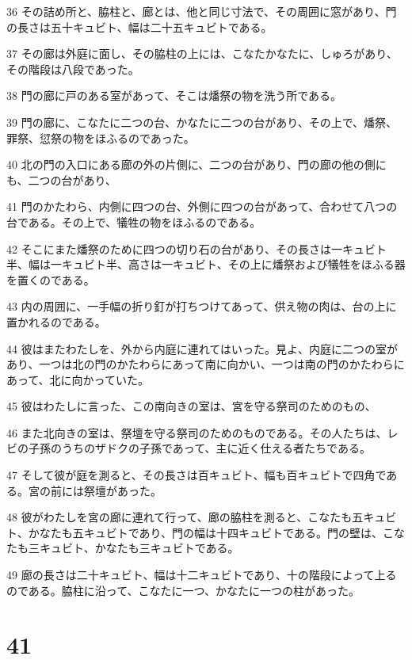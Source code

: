 \par 36 その詰め所と、脇柱と、廊とは、他と同じ寸法で、その周囲に窓があり、門の長さは五十キュビト、幅は二十五キュビトである。
\par 37 その廊は外庭に面し、その脇柱の上には、こなたかなたに、しゅろがあり、その階段は八段であった。
\par 38 門の廊に戸のある室があって、そこは燔祭の物を洗う所である。
\par 39 門の廊に、こなたに二つの台、かなたに二つの台があり、その上で、燔祭、罪祭、愆祭の物をほふるのであった。
\par 40 北の門の入口にある廊の外の片側に、二つの台があり、門の廊の他の側にも、二つの台があり、
\par 41 門のかたわら、内側に四つの台、外側に四つの台があって、合わせて八つの台である。その上で、犠牲の物をほふるのである。
\par 42 そこにまた燔祭のために四つの切り石の台があり、その長さは一キュビト半、幅は一キュビト半、高さは一キュビト、その上に燔祭および犠牲をほふる器を置くのである。
\par 43 内の周囲に、一手幅の折り釘が打ちつけてあって、供え物の肉は、台の上に置かれるのである。
\par 44 彼はまたわたしを、外から内庭に連れてはいった。見よ、内庭に二つの室があり、一つは北の門のかたわらにあって南に向かい、一つは南の門のかたわらにあって、北に向かっていた。
\par 45 彼はわたしに言った、この南向きの室は、宮を守る祭司のためのもの、
\par 46 また北向きの室は、祭壇を守る祭司のためのものである。その人たちは、レビの子孫のうちのザドクの子孫であって、主に近く仕える者たちである。
\par 47 そして彼が庭を測ると、その長さは百キュビト、幅も百キュビトで四角である。宮の前には祭壇があった。
\par 48 彼がわたしを宮の廊に連れて行って、廊の脇柱を測ると、こなたも五キュビト、かなたも五キュビトであり、門の幅は十四キュビトである。門の壁は、こなたも三キュビト、かなたも三キュビトである。
\par 49 廊の長さは二十キュビト、幅は十二キュビトであり、十の階段によって上るのである。脇柱に沿って、こなたに一つ、かなたに一つの柱があった。

\chapter{41}


